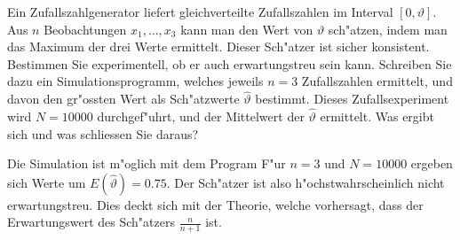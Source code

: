 Ein Zufallszahlgenerator liefert gleichverteilte Zufallszahlen im
Interval $[0,\vartheta]$. Aus $n$ Beobachtungen $x_1,\dots,x_3$ kann
man den Wert von $\vartheta$ sch"atzen, indem man das Maximum der
drei Werte ermittelt. Dieser Sch"atzer ist sicher konsistent.
Bestimmen Sie experimentell, ob er auch erwartungstreu sein kann.
Schreiben Sie dazu ein Simulationsprogramm, welches jeweils $n=3$
Zufallszahlen ermittelt, und davon den gr"ossten Wert als
Sch"atzwerte $\hat\vartheta$ bestimmt.
Dieses Zufallsexperiment wird $N=10000$ durchgef"uhrt, und der Mittelwert
der $\hat\vartheta$ ermittelt. Was ergibt sich und was schliessen Sie
daraus?

\begin{loesung}
Die Simulation ist m"oglich mit dem Program
{\small
{}
}
F"ur $n=3$ und $N=10000$ ergeben sich Werte  um $E(\hat\vartheta)=0.75$.
Der Sch"atzer ist also h"ochstwahrscheinlich nicht erwartungstreu.
Dies deckt sich mit der Theorie, welche vorhersagt, dass der Erwartungswert
des Sch"atzers $\frac{n}{n+1}$ ist.
\end{loesung}

